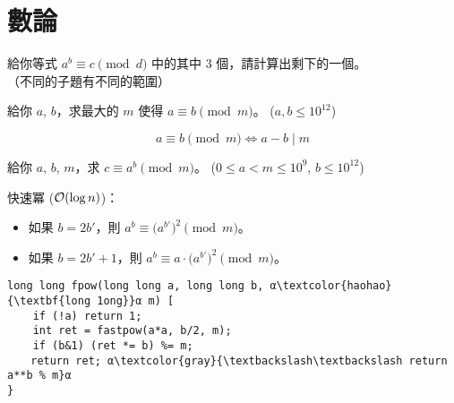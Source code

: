 \documentclass[standalone]{beamer}
\begin{document}
\section{數論}

\begin{frame}{}
  \begin{problem}
    給你等式 $a^b \equiv c \pmod{d}$ 中的其中 $3$ 個，請計算出剩下的一個。\\
    （不同的子題有不同的範圍）
  \end{problem}
\end{frame}

\begin{frame}{}
  \begin{problem}
    給你 $a$, $b$，求最大的 $m$ 使得 $a \equiv b \pmod{m}$。 ($a, b \leq 10^{12}$)
  \end{problem} \pause

  \begin{definition} \vspace{-0.5\baselineskip}
    \[ a \equiv b \pmod{m} \iff a - b \mid m \]
  \end{definition}
\end{frame}

\begin{frame}[fragile]{}
  \begin{problem}
    給你 $a$, $b$, $m$，求 $c \equiv a^b \pmod{m}$。 ($0 \leq a < m \leq 10^{9}$, $b \leq 10^{12}$)
  \end{problem} \pause \disskip
  快速冪 ($\mathcal{O}(\log n)$)： \disskip
  \begin{itemize}[<+->]
    \item 如果 $b = 2b'$，則 $a^b \equiv \big( a^{b'} \big)^2 \pmod{m}$。
    \item 如果 $b = 2b' + 1$，則 $a^b \equiv a \cdot \big( a^{b'} \big)^2 \pmod{m}$。
  \end{itemize} \vspace{-1em} \pause
  \begin{verbatim}
long long fpow(long long a, long long b, α\textcolor{haohao}{\textbf{long 1ong}}α m) [
    if (!a) return 1;
    int ret = fastpow(a*a, b/2, m);
    if (b&1) (ret *= b) %= m;
  　return ret; α\textcolor{gray}{\textbackslash\textbackslash return a**b % m}α
}
  \end{verbatim}
\end{frame}
\end{document}
